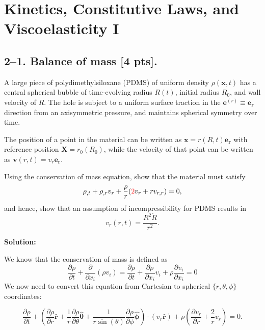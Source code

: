 \section*{Kinetics, Constitutive Laws, and Viscoelasticity I}

\subsection*{2--1. \textbf{Balance of mass} [4 pts].} 
A large piece of polydimethylsiloxane (PDMS) of uniform density $\rho(\bm{x},t)$ has a central spherical bubble of time-evolving radius $R(t)$, initial radius $R_0$, and wall velocity of $\dot{R}$. 
The hole is subject to a uniform surface traction in the $\bm{e}^{(r)} \equiv \bm{e}_{\bm{r}}$ direction from an axisymmetric pressure, and maintains spherical symmetry over time. 

\medskip
The position of a point in the material can be written as $\bm{x} = r(R,t) \bm{e}_{\bm{r}}$ with reference position $\bm{X} = r_0(R_0)$, while the velocity of that point can be written as $\bm{v}(r,t) = v_r \bm{e}_{\bm{r}}$.

\medskip
Using the conservation of mass equation, show that the material must satisfy
\begin{equation*}
\rho_{,t}+ \rho_{,r} v_r + \frac{\rho}{r} (\textcolor{red}{2}v_r + r v_{r,r}) = 0,
\end{equation*}
and hence, show that an assumption of incompressibility for PDMS results in 
\begin{equation*}
v_r(r,t) = \frac{R^2 \dot{R}}{r^2}.
\end{equation*}

\textbf{Solution:}

We know that the conservation of mass is defined as
\begin{equation*}
    \frac{\partial \rho}{\partial t} + \frac{\partial}{\partial x_i} (\rho v_i) = \frac{\partial \rho}{\partial t} + \frac{\partial \rho}{\partial x_i}v_i + \rho \frac{\partial v_i}{\partial x_i} = 0
\end{equation*}
We now need to convert this equation from Cartesian to spherical $\{ r, \theta, \phi\}$ coordinates:

\begin{equation*}
    \frac{\partial \rho}{\partial t} + \left(\frac{\partial \rho}{\partial r}\bm{\hat{r}} + \frac{1}{r} \frac{\partial \rho}{\partial \theta} \bm{\hat{\theta}} + \frac{1}{r\sin(\theta)}\frac{\partial \rho}{\partial \phi} \bm{\hat{\phi}}\right) \cdot (v_r\bm{\hat{r}}) + \rho \left(\frac{\partial v_r}{\partial r} + \frac{2}{r} v_r\right) = 0.
\end{equation*}

